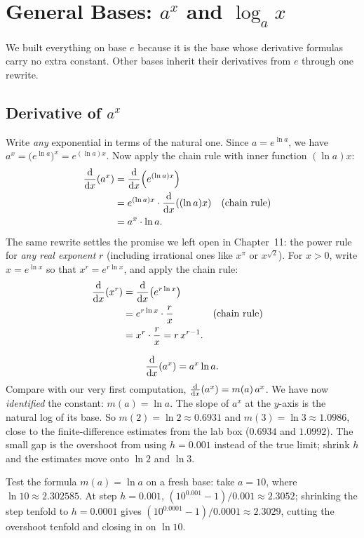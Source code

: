 \section{General Bases: $a^x$ and $\log_a x$}
\label{ch12:general-base}

We built everything on base $e$ because it is the base whose derivative
formulas carry no extra constant. Other bases inherit their derivatives from
$e$ through one rewrite.

\subsection{Derivative of $a^x$}

Write \emph{any} exponential in terms of the natural one.
Since $a = e^{\ln a}$, we have $a^x = \big(e^{\ln a}\big)^x = e^{(\ln a)x}$.
Now apply the chain rule with inner function $(\ln a)x$:
\begin{align*}
   \frac{\mathrm{d}}{\mathrm{d} x}\!\left(a^x\right)
   &= \frac{\mathrm{d}}{\mathrm{d} x}\!\left(e^{(\ln a)x}\right) \\
   &= e^{(\ln a)x}\cdot \frac{\mathrm{d}}{\mathrm{d} x}\!\left((\ln a)x\right)
   && \text{(chain rule)} \\
   &= a^x \cdot \ln a.
\end{align*}
The same rewrite settles the promise we left open in Chapter~11: the power rule
for \emph{any real exponent} $r$ (including irrational ones like $x^{\pi}$ or
$x^{\sqrt{2}}$). For $x > 0$, write $x = e^{\ln x}$ so that $x^r = e^{r\ln x}$,
and apply the chain rule:
\begin{align*}
   \frac{\mathrm{d}}{\mathrm{d} x}\!\left(x^r\right)
   &= \frac{\mathrm{d}}{\mathrm{d} x}\!\left(e^{r\ln x}\right) \\
   &= e^{r\ln x}\cdot \frac{r}{x}
   && \text{(chain rule)} \\
   &= x^r \cdot \frac{r}{x}
    = r\,x^{r-1}.
\end{align*}

\begin{focusbox}
\[
   \frac{\mathrm{d}}{\mathrm{d} x}\!\left(a^x\right) = a^x \ln a.
\]
Compare with our very first computation, $\frac{\mathrm{d}}{\mathrm{d} x}\!\left(a^x\right)=m(a)\,a^x$. We have now
\emph{identified} the constant: $m(a) = \ln a$. The slope of $a^x$ at
the $y$-axis is the natural log of its base. So $m(2)=\ln 2\approx 0.6931$
and $m(3)=\ln 3\approx 1.0986$, close to the finite-difference estimates
from the lab box ($0.6934$ and $1.0992$). The small gap is
the overshoot from using $h=0.001$ instead of the true limit; shrink $h$ and
the estimates move onto $\ln 2$ and $\ln 3$.
\end{focusbox}

\begin{labbox}
Test the formula $m(a)=\ln a$ on a fresh base: take $a=10$, where $\ln 10 \approx 2.302585$.
At step $h=0.001$, $(10^{0.001}-1)/0.001 \approx 2.3052$; shrinking the step tenfold to
$h=0.0001$ gives $(10^{0.0001}-1)/0.0001 \approx 2.3029$, cutting the overshoot tenfold
and closing in on $\ln 10$.
\end{labbox}

